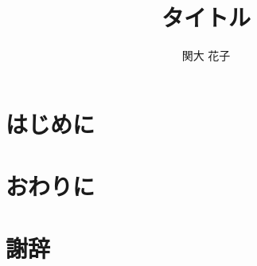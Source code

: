 \documentclass[a4j]{matsushita-zemi}
\title{タイトル}
\author{関大 花子}
\begin{document}
\maketitle

\section{はじめに}
\label{background} 


\section{おわりに}

\section*{謝辞}


%


\end{document}
